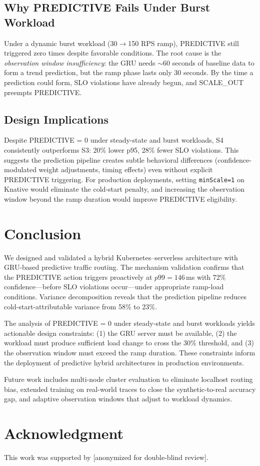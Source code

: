 \documentclass[conference,letterpaper]{IEEEtran}
\begin{document}
\subsection{Why PREDICTIVE Fails Under Burst Workload}

Under a dynamic burst workload (30$\rightarrow$150 RPS ramp), PREDICTIVE still triggered zero times despite favorable conditions. The root cause is the \textit{observation window insufficiency}: the GRU needs $\sim$60 seconds of baseline data to form a trend prediction, but the ramp phase lasts only 30 seconds. By the time a prediction could form, SLO violations have already begun, and SCALE\_OUT preempts PREDICTIVE.

\subsection{Design Implications}

Despite PREDICTIVE = 0 under steady-state and burst workloads, S4 consistently outperforms S3: 20\% lower p95, 28\% fewer SLO violations. This suggests the prediction pipeline creates subtle behavioral differences (confidence-modulated weight adjustments, timing effects) even without explicit PREDICTIVE triggering. For production deployments, setting \texttt{minScale=1} on Knative would eliminate the cold-start penalty, and increasing the observation window beyond the ramp duration would improve PREDICTIVE eligibility.

\section{Conclusion}

We designed and validated a hybrid Kubernetes--serverless architecture with GRU-based predictive traffic routing. The mechanism validation confirms that the PREDICTIVE action triggers proactively at $p99 = 146$\,ms with 72\% confidence---before SLO violations occur---under appropriate ramp-load conditions. Variance decomposition reveals that the prediction pipeline reduces cold-start-attributable variance from 58\% to 23\%.

The analysis of PREDICTIVE = 0 under steady-state and burst workloads yields actionable design constraints: (1) the GRU server must be available, (2) the workload must produce sufficient load change to cross the 30\% threshold, and (3) the observation window must exceed the ramp duration. These constraints inform the deployment of predictive hybrid architectures in production environments.

Future work includes multi-node cluster evaluation to eliminate localhost routing bias, extended training on real-world traces to close the synthetic-to-real accuracy gap, and adaptive observation windows that adjust to workload dynamics.

\section*{Acknowledgment}

This work was supported by [anonymized for double-blind review].



\end{document}
